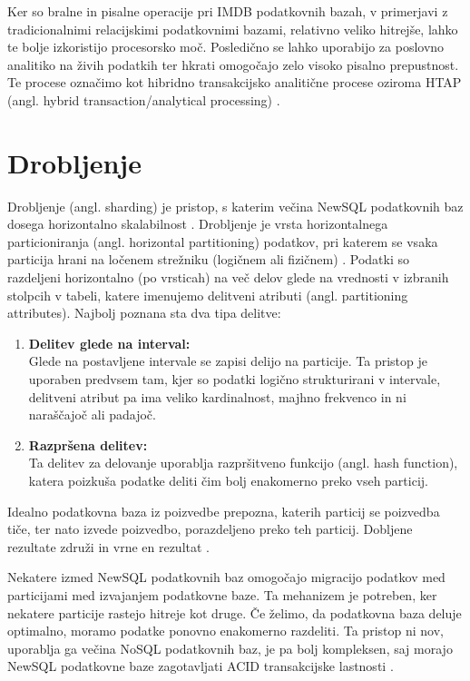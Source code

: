 \documentclass[a4paper, 12pt]{book}
\begin{document}
Ker so bralne in pisalne operacije pri IMDB podatkovnih bazah, v primerjavi z tradicionalnimi relacijskimi podatkovnimi bazami, relativno veliko hitrejše, lahko te bolje izkoristijo procesorsko moč. Posledično se lahko uporabijo za poslovno analitiko na živih podatkih ter hkrati omogočajo zelo visoko pisalno prepustnost. Te procese označimo kot hibridno transakcijsko analitične procese oziroma HTAP (angl. hybrid transaction/analytical processing) \cite{NewSqlInMemoryAnalytics}.


\section{Drobljenje}
Drobljenje (angl. sharding) je pristop, s katerim večina NewSQL podatkovnih baz dosega horizontalno skalabilnost \cite{Pavlo2016Sep}. Drobljenje je vrsta horizontalnega particioniranja (angl. horizontal partitioning) podatkov, pri katerem se vsaka particija hrani na ločenem strežniku (logičnem ali fizičnem) \cite{WikiSharding}. Podatki so razdeljeni horizontalno (po vrsticah) na več delov glede na vrednosti v izbranih stolpcih v tabeli, katere imenujemo delitveni atributi (angl. partitioning attributes). Najbolj poznana sta dva tipa delitve:

\begin{enumerate}
    \item \textbf{Delitev glede na interval:}\\Glede na postavljene intervale se zapisi delijo na particije. Ta pristop je uporaben predvsem tam, kjer so podatki logično strukturirani v intervale, delitveni atribut pa ima veliko kardinalnost, majhno frekvenco in ni naraščajoč ali padajoč.
    \item \textbf{Razpršena delitev:}\\Ta delitev za delovanje uporablja razpršitveno funkcijo (angl. hash function), katera poizkuša podatke deliti čim bolj enakomerno preko vseh particij.
\end{enumerate}

Idealno podatkovna baza iz poizvedbe prepozna, katerih particij se poizvedba tiče, ter nato izvede poizvedbo, porazdeljeno preko teh particij. Dobljene rezultate združi in vrne en rezultat \cite{Pavlo2016Sep}.

Nekatere izmed NewSQL podatkovnih baz omogočajo migracijo podatkov med particijami med izvajanjem podatkovne baze. Ta mehanizem je potreben, ker nekatere particije rastejo hitreje kot druge. Če želimo, da podatkovna baza deluje optimalno, moramo podatke ponovno enakomerno razdeliti. Ta pristop ni nov, uporablja ga večina NoSQL podatkovnih baz, je pa bolj kompleksen, saj morajo NewSQL podatkovne baze zagotavljati ACID transakcijske lastnosti \cite{Pavlo2016Sep}.
\end{document}
